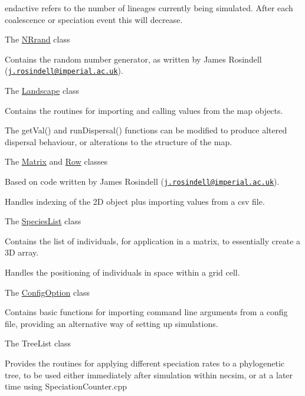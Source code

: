 \begin{DoxyItemize}
\begin{DoxyItemize}
\item {\ttfamily endactive} refers to the number of lineages currently being simulated. After each coalescence or speciation event this will decrease.
\end{DoxyItemize}
\item The {\ttfamily \hyperlink{class_n_rrand}{N\+Rrand}} class
\begin{DoxyItemize}
\item Contains the random number generator, as written by James Rosindell (\href{mailto:j.rosindell@imperial.ac.uk}{\tt j.\+rosindell@imperial.\+ac.\+uk}).
\end{DoxyItemize}
\item The {\ttfamily \hyperlink{class_landscape}{Landscape}} class
\begin{DoxyItemize}
\item Contains the routines for importing and calling values from the map objects.
\item The {\ttfamily get\+Val()} and {\ttfamily run\+Dispersal()} functions can be modified to produce altered dispersal behaviour, or alterations to the structure of the map.
\end{DoxyItemize}
\item The {\ttfamily \hyperlink{class_matrix}{Matrix}} and {\ttfamily \hyperlink{class_row}{Row}} classes
\begin{DoxyItemize}
\item Based on code written by James Rosindell (\href{mailto:j.rosindell@imperial.ac.uk}{\tt j.\+rosindell@imperial.\+ac.\+uk}).
\item Handles indexing of the 2D object plus importing values from a csv file.
\end{DoxyItemize}
\item The {\ttfamily \hyperlink{class_species_list}{Species\+List}} class
\begin{DoxyItemize}
\item Contains the list of individuals, for application in a matrix, to essentially create a 3D array.
\item Handles the positioning of individuals in space within a grid cell.
\end{DoxyItemize}
\item The {\ttfamily \hyperlink{class_config_option}{Config\+Option}} class
\begin{DoxyItemize}
\item Contains basic functions for importing command line arguments from a config file, providing an alternative way of setting up simulations.
\end{DoxyItemize}
\item The {\ttfamily Tree\+List} class
\begin{DoxyItemize}
\item Provides the routines for applying different speciation rates to a phylogenetic tree, to be used either immediately after simulation within necsim, or at a later time using Speciation\+Counter.\+cpp
\end{DoxyItemize}
\end{DoxyItemize}

